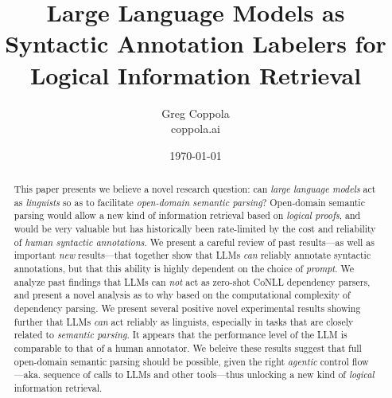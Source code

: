 \documentclass[11pt]{article}
\title{Large Language Models as Syntactic Annotation Labelers for Logical Information Retrieval}
\author{Greg Coppola\\coppola.ai}
\date{\today}
\begin{document}
\maketitle

\begin{abstract}
This paper presents we believe a novel research question: can \emph{large language models} act as \emph{linguists} so as to facilitate \emph{open-domain semantic parsing}?
Open-domain semantic parsing would allow a new kind of information retrieval based on \emph{logical proofs}, and would be very valuable but has historically been rate-limited by the cost and reliability of \emph{human syntactic annotations}.
We present a careful review of past results---as well as important {\em new} results---that together show that LLMs \emph{can} reliably annotate syntactic annotations, but that this ability is highly dependent on the choice of \emph{prompt}.
We analyze past findings that LLMs can \emph{not} act as zero-shot CoNLL dependency parsers, and present a novel analysis as to why based on the computational complexity of dependency parsing.
We present several positive novel experimental results showing further that LLMs \emph{can} act reliably as linguists, especially in tasks that are closely related to \emph{semantic parsing}.
It appears that the performance level of the LLM is comparable to that of a human annotator.
We beleive these results suggest that full open-domain semantic parsing should be possible, given the right \emph{agentic} control flow---aka. sequence of calls to LLMs and other tools---thus unlocking a new kind of \emph{logical} information retrieval.
\end{abstract}
\end{document}
